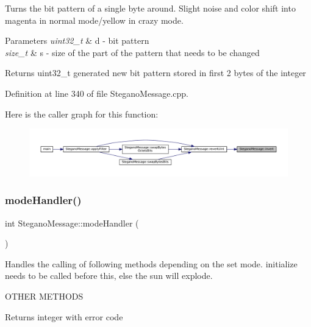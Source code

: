 Turns the bit pattern of a single byte around. Slight noise and color shift into magenta in normal mode/yellow in crazy mode. 


\begin{DoxyParams}{Parameters}
{\em uint32\+\_\+t} & d -\/ bit pattern \\
\hline
{\em size\+\_\+t} & s -\/ size of the part of the pattern that needs to be changed \\
\hline
\end{DoxyParams}
\begin{DoxyReturn}{Returns}
uint32\+\_\+t generated new bit pattern stored in first 2 bytes of the integer 
\end{DoxyReturn}


Definition at line 340 of file Stegano\+Message.\+cpp.

Here is the caller graph for this function\+:\nopagebreak
\begin{figure}[H]
\begin{center}
\leavevmode
\includegraphics[width=350pt]{classSteganoMessage_af46fa3a09a19fc73c146e22d6a32657a_icgraph}
\end{center}
\end{figure}
\mbox{\label{classSteganoMessage_a2649e515941e730520b759282d00dcd6}} 
\subsubsection{\texorpdfstring{modeHandler()}{modeHandler()}}
{\footnotesize\ttfamily int Stegano\+Message\+::mode\+Handler (\begin{DoxyParamCaption}{ }\end{DoxyParamCaption})}



Handles the calling of following methods depending on the set mode. initialize needs to be called before this, else the sun will explode. 

O\+T\+H\+ER M\+E\+T\+H\+O\+DS\begin{DoxyReturn}{Returns}
integer with error code 
\end{DoxyReturn}


